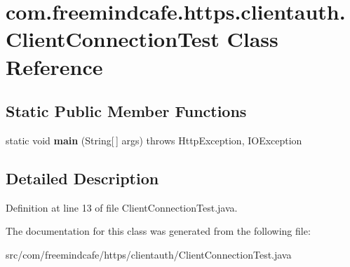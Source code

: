 \hypertarget{classcom_1_1freemindcafe_1_1https_1_1clientauth_1_1_client_connection_test}{}\section{com.\+freemindcafe.\+https.\+clientauth.\+Client\+Connection\+Test Class Reference}
\label{classcom_1_1freemindcafe_1_1https_1_1clientauth_1_1_client_connection_test}
\subsection*{Static Public Member Functions}
\begin{DoxyCompactItemize}
\item 
\hypertarget{classcom_1_1freemindcafe_1_1https_1_1clientauth_1_1_client_connection_test_aabac4b20e0e721cdd4b253917349e31e}{}static void {\bfseries main} (String\mbox{[}$\,$\mbox{]} args)  throws Http\+Exception, I\+O\+Exception    \label{classcom_1_1freemindcafe_1_1https_1_1clientauth_1_1_client_connection_test_aabac4b20e0e721cdd4b253917349e31e}

\end{DoxyCompactItemize}


\subsection{Detailed Description}


Definition at line 13 of file Client\+Connection\+Test.\+java.



The documentation for this class was generated from the following file\+:\begin{DoxyCompactItemize}
\item 
src/com/freemindcafe/https/clientauth/Client\+Connection\+Test.\+java\end{DoxyCompactItemize}
